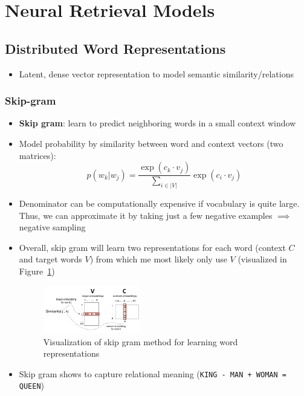 \section{Neural Retrieval Models}
\subsection{Distributed Word Representations}
\begin{itemize}
	\item Latent, dense vector representation to model semantic similarity/relations
	
\end{itemize}
\subsubsection{Skip-gram}
\begin{itemize}
	\item \textbf{Skip gram}: learn to predict neighboring words in a small context window
	\item Model probability by similarity between word and context vectors (two matrices):
	$$p(w_k|w_j) = \frac{\exp\left(c_k \cdot v_j\right)}{\sum_{i\in|V|}} \exp\left(c_i \cdot v_j\right)$$
	\item Denominator can be computationally expensive if vocabulary is quite large. Thus, we can approximate it by taking just a few negative examples $\implies$ negative sampling
	\item Overall, skip gram will learn two representations for each word (context $C$ and target words $V$) from which me most likely only use $V$ (visualized in Figure~\ref{img:neural_ir_skip_gram})
	\begin{figure}[ht]
		\centering
		\includegraphics[width=0.4\textwidth]{figures/neural_ir_skip_gram.png}
		\caption{Visualization of skip gram method for learning word representations}
		\label{img:neural_ir_skip_gram}
	\end{figure}
	\item Skip gram shows to capture relational meaning (\texttt{KING - MAN + WOMAN = QUEEN})
\end{itemize}
